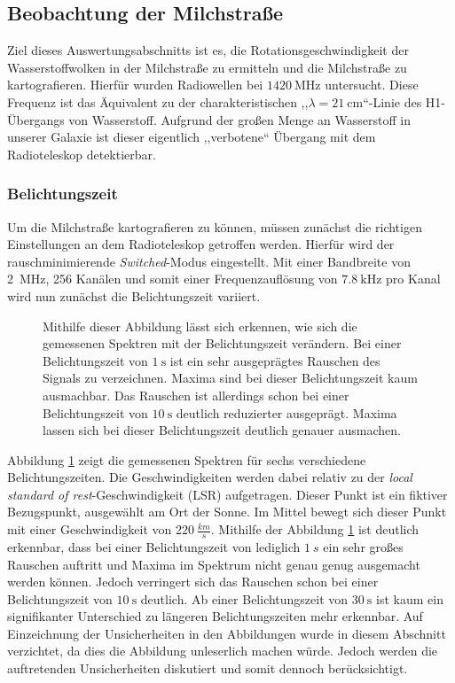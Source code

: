 \subsection{Beobachtung der Milchstraße}
Ziel dieses Auswertungsabschnitts ist es, die Rotationsgeschwindigkeit der Wasserstoffwolken in der Milchstraße zu ermitteln und die Milchstraße zu kartografieren.\newline
Hierfür wurden Radiowellen bei $\SI{1420}{\mega \hertz}$ untersucht. Diese Frequenz ist das Äquivalent zu der charakteristischen ,,$\lambda = \SI{21}{\centi \metre}$``-Linie des H1-Übergangs von Wasserstoff. Aufgrund der großen Menge an Wasserstoff in unserer Galaxie ist dieser eigentlich ,,verbotene`` Übergang mit dem Radioteleskop detektierbar.\newline
\subsubsection{Belichtungszeit}
Um die Milchstraße kartografieren zu können, müssen zunächst die richtigen Einstellungen an dem Radioteleskop getroffen werden. Hierfür wird der rauschminimierende \textit{Switched}-Modus eingestellt. Mit einer Bandbreite von \SI{2}{MHz}, 256 Kanälen und somit einer Frequenzauflösung von $\SI{7.8}{\kilo \hertz}$ pro Kanal \cite{Usermanual} wird nun zunächst die Belichtungszeit variiert. 
\begin{figure}[H]
    \centering
    \resizebox{0.8\textwidth}{!}{} 
    \caption[Gemessene Spektren bei verschiedenen Belichtungszeiten]{Mithilfe dieser Abbildung lässt sich erkennen, wie sich die gemessenen Spektren mit der Belichtungszeit verändern. Bei einer Belichtungszeit von $\SI{1}{\second}$ ist ein sehr ausgeprägtes Rauschen des Signals zu verzeichnen. Maxima sind bei dieser Belichtungszeit kaum ausmachbar. Das Rauschen ist allerdings schon bei einer Belichtungszeit von $\SI{10}{\second}$ deutlich reduzierter ausgeprägt. Maxima lassen sich bei dieser Belichtungszeit deutlich genauer ausmachen.}
    \label{fig:Belichtungszeit}
\end{figure}
Abbildung \ref{fig:Belichtungszeit} zeigt die gemessenen Spektren für sechs verschiedene Belichtungszeiten. Die Geschwindigkeiten werden dabei relativ zu der \textit{local standard of rest}-Geschwindigkeit (LSR) aufgetragen. Dieser Punkt ist ein fiktiver Bezugspunkt, ausgewählt am Ort der Sonne. Im Mittel bewegt sich dieser Punkt mit einer Geschwindigkeit von $\SI{220}{\frac{km}{s}}$.
Mithilfe der Abbildung \ref{fig:Belichtungszeit} ist deutlich erkennbar, dass bei einer Belichtungszeit von lediglich $\SI{1}{s}$ ein sehr großes Rauschen auftritt und Maxima im Spektrum nicht genau genug ausgemacht werden können. Jedoch verringert sich das Rauschen schon bei einer Belichtungszeit von $\SI{10}{\second}$ deutlich. Ab einer Belichtungszeit von $\SI{30}{\second}$ ist kaum ein signifikanter Unterschied zu längeren Belichtungszeiten mehr erkennbar. Auf Einzeichnung der Unsicherheiten in den Abbildungen wurde in diesem Abschnitt verzichtet, da dies die Abbildung unleserlich machen würde. Jedoch werden die auftretenden Unsicherheiten diskutiert und somit dennoch berücksichtigt.

